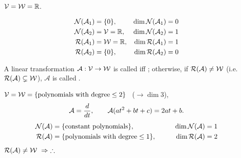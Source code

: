 \begin{example}\leavevmode{}
$\mathcal{V}=\mathcal{W}=\mathbb{R}$.
\begin{center}
\begin{minipage}{0.36\textwidth}\centering
{}
\end{minipage}%
\begin{minipage}{0.6\textwidth}
\begin{align*}
\mathcal{N}(\mathcal{A}_1)&=\{0\}, & \dim\mathcal{N}(\mathcal{A}_1)&=0\\
\mathcal{N}(\mathcal{A}_2)&=\mathcal{V}=\mathbb{R}, & \dim\mathcal{N}(\mathcal{A}_2)&=1\\
\mathcal{R}(\mathcal{A}_1)&=\mathcal{W}=\mathbb{R}, & \dim\mathcal{R}(\mathcal{A}_1)&=1\\
\mathcal{R}(\mathcal{A}_2)&=\{0\}, & \dim\mathcal{R}(\mathcal{A}_2)&=0
\end{align*}
\end{minipage}
\end{center}
\end{example}

\begin{definition}
A linear transformation $\mathcal{A}:\mathcal{V}\to\mathcal{W}$ is called  iff ; otherwise, if $\mathcal{R}(\mathcal{A})\ne\mathcal{W}$ (i.e.\ $\mathcal{R}(\mathcal{A})\subsetneq\mathcal{W}$), $\mathcal{A}$ is called .
\end{definition}

\begin{example}
$\mathcal{V}=\mathcal{W}=\{\text{polynomials with degree}\le 2\}$ \ ($\to\dim 3$),
\begin{gather*}
\mathcal{A}=\frac{d}{dt}, \qquad \mathcal{A}(at^2+bt+c)=2at+b.\\[0.4em]
\begin{aligned}
\mathcal{N}(\mathcal{A})&=\{\text{constant polynomials}\}, &\qquad \dim\mathcal{N}(\mathcal{A})&=1\\
\mathcal{R}(\mathcal{A})&=\{\text{polynomials with degree}\le 1\}, & \dim\mathcal{R}(\mathcal{A})&=2
\end{aligned}
\end{gather*}
$\Range(\mathcal{A})\ne \W \ \Rightarrow\ \therefore$ 
\end{example}

